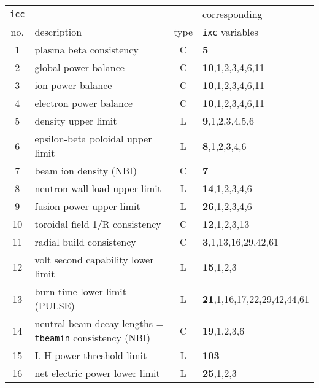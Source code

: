 \documentclass[11pt,a4paper]{report}
\begin{document}
\begin{table}[tbph]
\footnotesize
\begin{center}

\begin{tabular}{||c|l|c|l||} \hline
\texttt{icc} &                                                  &      & corresponding \\
no. & description                                               & type & \texttt{ixc} variables \\ \hline
1   & plasma beta consistency                                   & C    & \textbf{5} \\
2   & global power balance                                      & C    & \textbf{10},1,2,3,4,6,11 \\
3   & ion power balance                                         & C    & \textbf{10},1,2,3,4,6,11 \\
4   & electron power balance                                    & C    & \textbf{10},1,2,3,4,6,11 \\
5   & density upper limit                                       & L    & \textbf{9},1,2,3,4,5,6 \\
6   & epsilon-beta poloidal upper limit                         & L    & \textbf{8},1,2,3,4,6 \\
7   & beam ion density (NBI)                                    & C    & \textbf{7} \\
8   & neutron wall load upper limit                             & L    & \textbf{14},1,2,3,4,6 \\
9   & fusion power upper limit                                  & L    & \textbf{26},1,2,3,4,6 \\
10  & toroidal field 1/R consistency                            & C    & \textbf{12},1,2,3,13 \\
11  & radial build consistency                                  & C    & \textbf{3},1,13,16,29,42,61 \\
12  & volt second capability lower limit                        & L    & \textbf{15},1,2,3 \\
13  & burn time lower limit (PULSE)                             & L    & \textbf{21},1,16,17,22,29,42,44,61 \\
14  & neutral beam decay lengths = \texttt{tbeamin} consistency (NBI) & C    & \textbf{19},1,2,3,6 \\
15  & L-H power threshold limit                                 & L    & \textbf{103} \\
16  & net electric power lower limit                            & L    & \textbf{25},1,2,3 \\

\end{tabular}
\end{center}
\end{table}
\end{document}
